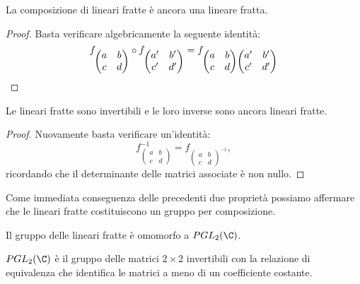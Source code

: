 \begin{pr}\label{linFra:1}
	La composizione di lineari fratte è ancora una lineare fratta.
\end{pr}

\begin{proof}
	Basta verificare algebricamente la seguente identità:
	\[
		f_{\begin{pmatrix}a & b\\c & d\end{pmatrix}} \circ f_{\begin{pmatrix}a' & b'\\c' & d'\end{pmatrix}} = f_{\begin{pmatrix}a & b\\c & d\end{pmatrix}\begin{pmatrix}a' & b'\\c' & d'\end{pmatrix}}\qedhere
	\]
\end{proof}

\begin{pr}\label{linFra:2}
	Le lineari fratte sono invertibili e le loro inverse sono ancora lineari fratte.
\end{pr}

\begin{proof}
	Nuovamente basta verificare un'identità:
	\[
		f_{\begin{pmatrix}a & b\\c & d\end{pmatrix}}^{-1} = f_{\begin{pmatrix}a & b\\c & d\end{pmatrix}^{-1}},
	\]
	ricordando che il determinante delle matrici associate è non nullo.
\end{proof}

\begin{oss}
	Come immediata conseguenza delle precedenti due proprietà possiamo affermare che le lineari fratte costituiscono un gruppo per composizione.
\end{oss}

\begin{pr}\label{linFra:3}
	Il gruppo delle lineari fratte è omomorfo a \(PGL_2(\C)\).
\end{pr}

\begin{notz}
	\(PGL_2(\C)\) è il gruppo delle matrici \(2\times 2\) invertibili con la relazione di equivalenza che identifica le matrici a meno di un coefficiente costante.
\end{notz}


